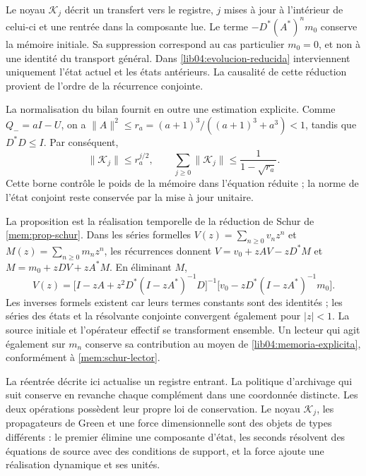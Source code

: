 Le noyau \(\mathscr K_j\) décrit un transfert vers le registre, \(j\) mises à jour à l'intérieur de celui-ci et une rentrée dans la composante lue. Le terme \(-D^*(A^*)^nm_0\) conserve la mémoire initiale. Sa suppression correspond au cas particulier \(m_0=0\), et non à une identité du transport général. Dans \eqref{lib04:evolucion-reducida} interviennent uniquement l'état actuel et les états antérieurs. La causalité de cette réduction provient de l'ordre de la récurrence conjointe.

La normalisation du bilan fournit en outre une estimation explicite.
Comme \(Q_-=aI-U\), on a
\(\|A\|^2\leq r_a=(a+1)^3/((a+1)^3+a^3)<1\), tandis que
\(D^*D\leq I\). Par conséquent,
\begin{equation}
 \|\mathscr K_j\|\leq r_a^{j/2},\qquad
 \sum_{j\geq0}\|\mathscr K_j\|
 \leq\frac{1}{1-\sqrt{r_a}}.
 \label{lib04:cota-nucleo-retardo}
\end{equation}
Cette borne contrôle le poids de la mémoire dans l’équation réduite ; la norme
de l’état conjoint reste conservée par la mise à jour unitaire.

La proposition est la réalisation temporelle de la réduction de Schur de
\cref{mem:prop-schur}. Dans les séries formelles
\(V(z)=\sum_{n\geq0}v_nz^n\) et
\(M(z)=\sum_{n\geq0}m_nz^n\), les récurrences donnent
\(V=v_0+zAV-zD^*M\) et \(M=m_0+zDV+zA^*M\). En éliminant \(M\),
\begin{equation}
 V(z)=\bigl[I-zA+z^2D^*(I-zA^*)^{-1}D\bigr]^{-1}
       \bigl[v_0-zD^*(I-zA^*)^{-1}m_0\bigr].
 \label{lib04:schur-bilateral}
\end{equation}
Les inverses formels existent car leurs termes constants sont des identités ;
les séries des états et la résolvante conjointe convergent également pour
\(|z|<1\). La source initiale et l’opérateur effectif se transforment ensemble.
Un lecteur qui agit également sur \(m_n\) conserve sa contribution au moyen de
\eqref{lib04:memoria-explicita}, conformément à \eqref{mem:schur-lector}.

La réentrée décrite ici actualise un registre entrant. La politique
d’archivage qui suit conserve en revanche chaque complément dans une coordonnée
distincte. Les deux opérations possèdent leur propre loi de conservation. Le noyau
\(\mathscr K_j\), les propagateurs de Green et une force dimensionnelle sont
des objets de types différents : le premier élimine une composante d’état,
les seconds résolvent des équations de source avec des conditions de support, et
la force ajoute une réalisation dynamique et ses unités.
